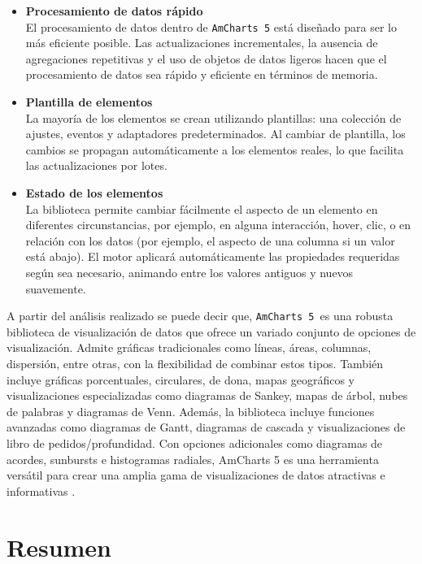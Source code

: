 \begin{itemize}
    \item \textbf{Procesamiento de datos rápido}\\
    El procesamiento de datos dentro de \texttt{AmCharts 5} está diseñado para ser lo más eficiente posible. Las actualizaciones incrementales, la ausencia de agregaciones repetitivas y el uso de objetos de datos ligeros hacen que el procesamiento de datos sea rápido y eficiente en términos de memoria.

    \item \textbf{Plantilla de elementos}\\
    La mayoría de los elementos se crean utilizando plantillas: una colección de ajustes, eventos y adaptadores predeterminados. Al cambiar de plantilla, los cambios se propagan automáticamente a los elementos reales, lo que facilita las actualizaciones por lotes.

    \item \textbf{Estado de los elementos}\\
    La biblioteca permite cambiar fácilmente el aspecto de un elemento en diferentes circunstancias, por ejemplo, en alguna interacción, hover, clic, o en relación con los datos (por ejemplo, el aspecto de una columna si un valor está abajo).
    El motor aplicará automáticamente las propiedades requeridas según sea necesario, animando entre los valores antiguos y nuevos suavemente.
\end{itemize}

A partir del análisis realizado se puede decir que, \texttt{AmCharts 5 }es una robusta biblioteca de visualización de datos que ofrece un variado conjunto de opciones de visualización. 
Admite gráficas tradicionales como líneas, áreas, columnas, dispersión, entre otras, con la flexibilidad de combinar estos tipos. También incluye gráficas porcentuales, circulares, de dona, mapas geográficos y visualizaciones especializadas como diagramas de Sankey, mapas de árbol, nubes de palabras y diagramas de Venn. Además, la biblioteca incluye funciones avanzadas como diagramas de Gantt, diagramas de cascada y visualizaciones de libro de pedidos/profundidad. Con opciones adicionales como diagramas de acordes, sunbursts e histogramas radiales, AmCharts 5 es una herramienta versátil para crear una amplia gama de visualizaciones de datos atractivas e informativas \cite{amcharts_about}.


\section{Resumen}

